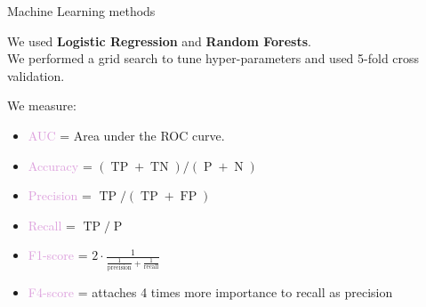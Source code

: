 \documentclass[usenames,dvipsnames]{beamer}
\newcommand{\TP}{\operatorname{TP}}
\newcommand{\TN}{\operatorname{TN}}
\newcommand{\FP}{\operatorname{FP}}
\begin{document}
\begin{frame}{Machine Learning methods}

We used \textbf{Logistic Regression} and \textbf{Random Forests}. \\
We performed a grid search to tune hyper-parameters and used 5-fold cross validation.  
\medskip

We measure:
\begin{itemize}
\item \textcolor{Plum}{AUC} = Area under the ROC curve.
\item \textcolor{Plum}{Accuracy} = $(\TP + \TN) / (\operatorname{P} + \operatorname{N})$
\item \textcolor{Plum}{Precision} = $\TP / (\TP + \FP)$
\item \textcolor{Plum}{Recall} = $\TP / \operatorname{P}$
\item \textcolor{Plum}{F1-score} = 
	$ 2 \cdot \frac{1}{ \frac{1}{\mbox{precision}} + \frac{1}{\mbox{recall}} } $
\item \textcolor{Plum}{F4-score} = attaches 4 times more importance to recall as precision
\end{itemize}

\end{frame}
\end{document}

